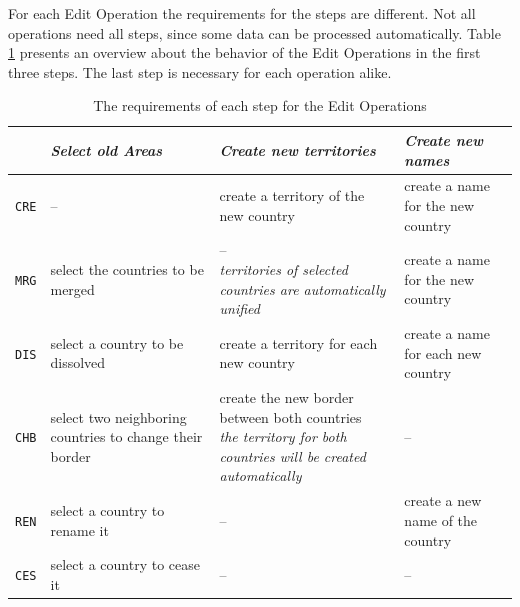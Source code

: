 For each Edit Operation the requirements for the steps are different. Not all operations need all steps, since some data can be processed automatically. Table \ref{tab:editoperations_in_worklow} presents an overview about the behavior of the Edit Operations in the first three steps. The last step is necessary for each operation alike.


\vspace{1em}
\begin{table}[H]
\begin{center}
\begin{tabular}{m{0.9cm} m{4.2cm} m{4.2cm} m{3.5cm}}
  \toprule

  &
  \emph{Select old Areas} &
  \emph{Create new territories} &
  \emph{Create new names} \\

  \midrule
  \texttt{CRE} &
  -- &
  create a territory of the new country &
  create a name for the new country \\

  \midrule
  \texttt{MRG} &
  select the countries to be merged &
  \pbox{4.4cm}{--\\
  \footnotesize{\emph{territories of selected countries are automatically unified}}} &
  create a name for the new country
  \\

  \midrule
  \texttt{DIS} &
  select a country to be \mbox{dissolved} &
  create a territory for each new country &
  create a name for each new country \\

  \midrule
  \texttt{CHB} &
  select two neighboring countries to change their border &
  \pbox{4.4cm}{create the new border between both countries \\
  \footnotesize{\emph{the territory for both countries will be created automatically}}}  &
  -- \\

  \midrule
  \texttt{REN} &
  select a country to rename it &
  -- &
  create a new name of the country \\

  \midrule
  \texttt{CES} &
  select a country to cease it &
  -- &
  -- \\

  \bottomrule
\end{tabular}
\caption{The requirements of each step for the Edit Operations}
\label{tab:editoperations_in_worklow}
\end{center}
\end{table}

